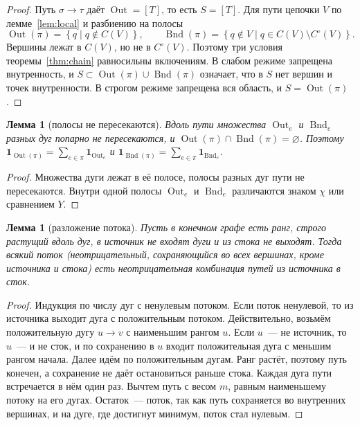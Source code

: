 \documentclass[a4paper,11pt]{article}
\theoremstyle{plain}
\newtheorem{lemma}[theorem]{Лемма}
\theoremstyle{definition}
\theoremstyle{remark}
\newcommand{\set}[1]{\left\{ #1 \right\}}
\DeclareMathOperator{\Out}{Out}
\DeclareMathOperator{\Bnd}{Bnd}
\begin{document}
\begin{proof}
    Путь $\sigma\to\tau$ даёт $\Out=[T]$, то есть $S=[T]$. Для пути цепочки $V$ по лемме~\ref{lem:local} и разбиению на полосы
    \[
        \Out(\pi)=\set{q\mid q\notin C(V)},\qquad \Bnd(\pi)=\set{q\notin V\mid q\in C(V)\setminus C^\circ(V)}.
    \]
    Вершины лежат в $C(V)$, но не в $C^\circ(V)$. Поэтому три условия теоремы~\ref{thm:chain} равносильны включениям. В слабом режиме запрещена внутренность, и $S\subset\Out(\pi)\cup\Bnd(\pi)$ означает, что в $S$ нет вершин и точек внутренности. В строгом режиме запрещена вся область, и $S=\Out(\pi)$.
\end{proof}

\begin{lemma}[полосы не пересекаются]\label{lem:disjoint}
    Вдоль пути множества $\Out_e$ и $\Bnd_e$ разных дуг попарно не пересекаются, и $\Out(\pi)\cap\Bnd(\pi)=\varnothing$. Поэтому $\mathbf 1_{\Out(\pi)}=\sum_{e\in\pi}\mathbf 1_{\Out_e}$ и $\mathbf 1_{\Bnd(\pi)}=\sum_{e\in\pi}\mathbf 1_{\Bnd_e}$.
\end{lemma}

\begin{proof}
    Множества дуги лежат в её полосе, полосы разных дуг пути не пересекаются. Внутри одной полосы $\Out_e$ и $\Bnd_e$ различаются знаком $\chi$ или сравнением $Y$.
\end{proof}

\begin{lemma}[разложение потока]\label{lem:decomp}
    Пусть в конечном графе есть ранг, строго растущий вдоль дуг, в источник не входят дуги и из стока не выходят. Тогда всякий поток (неотрицательный, сохраняющийся во всех вершинах, кроме источника и стока) есть неотрицательная комбинация путей из источника в сток.
\end{lemma}

\begin{proof}
    Индукция по числу дуг с ненулевым потоком. Если поток ненулевой, то из источника выходит дуга с положительным потоком. Действительно, возьмём положительную дугу $u\to v$ с наименьшим рангом $u$. Если $u$~--- не источник, то $u$~--- и не сток, и по сохранению в $u$ входит положительная дуга с меньшим рангом начала. Далее идём по положительным дугам. Ранг растёт, поэтому путь конечен, а сохранение не даёт остановиться раньше стока. Каждая дуга пути встречается в нём один раз. Вычтем путь с весом $m$, равным наименьшему потоку на его дугах. Остаток~--- поток, так как путь сохраняется во внутренних вершинах, и на дуге, где достигнут минимум, поток стал нулевым.
\end{proof}
\end{document}
